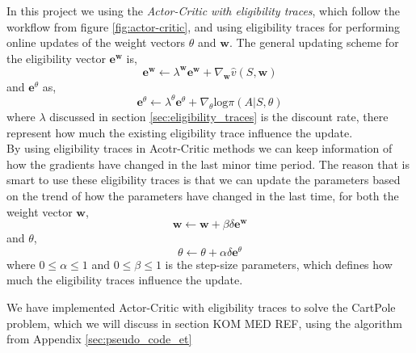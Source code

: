 \documentclass[11pt]{article}
\begin{document}
In this project we using the \textit{Actor-Critic with eligibility traces}, which follow the workflow from figure \ref{fig:actor-critic}, and using eligibility traces for performing online updates of the weight vectors $\theta$ and $\mathbf{w}$. The general updating scheme for the eligibility vector $\mathbf{e}^{\mathbf{w}}$ is,
\begin{equation}
    \mathbf{e}^{\mathbf{w}} \leftarrow \lambda^{\mathbf{w}} \mathbf{e}^{\mathbf{w}} + \nabla_{\mathbf{w}} \hat{v}(S, \mathbf{w})
\end{equation}
and $\mathbf{e}^{\theta}$ as,
\begin{equation}
    \mathbf{e}^{\theta} \leftarrow \lambda^{\theta} \mathbf{e}^{\theta} + \nabla_{\theta} \text{log} \pi (A | S, \theta)
\end{equation}
where $\lambda$ discussed in section \ref{sec:eligibility_traces} is the discount rate, there represent how much the existing eligibility trace influence the update.
\\
By using eligibility traces in Acotr-Critic methods we can keep information of how the gradients have changed in the last minor time period. The reason that is smart to use these eligibility traces is that we can update the parameters based on the trend of how the parameters have changed in the last time, for both the weight vector $\mathbf{w}$,
\begin{equation}
    \mathbf{w} \leftarrow \mathbf{w} + \beta \delta \mathbf{e}^{\mathbf{w}}
\end{equation}
and $\theta$,
\begin{equation}
    \theta \leftarrow \theta + \alpha \delta \mathbf{e}^{\theta}
\end{equation}
where $0 \leq \alpha \leq 1$ and $0 \leq \beta \leq 1$ is the step-size parameters, which defines how much the eligibility traces influence the update. 

We have implemented Actor-Critic with eligibility traces to solve the CartPole problem, which we will discuss in section KOM MED REF, using the algorithm from Appendix \ref{sec:pseudo_code_et}








%
%
\end{document}
